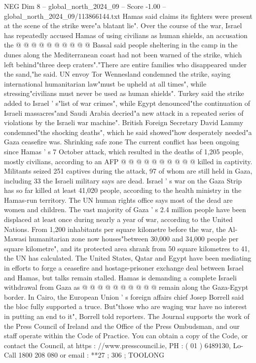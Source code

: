 \begin{textsample}{NEG Dim 8 – global\_north\_2024\_09 – Score -1.00 – global\_north\_2024\_09/113866144.txt}
Hamas said claims its fighters were present at the scene of the strike were"a blatant lie".
Over the course of the war, Israel has repeatedly accused Hamas of using civilians as human shields, an accusation the @ @ @ @ @ @ @ @ @ @ Bassal said people sheltering in the camp in the dunes along the Mediterranean coast had not been warned of the strike, which left behind"three deep craters"."There are entire families who disappeared under the sand,"he said.
UN envoy Tor Wennesland condemned the strike, saying international humanitarian law"must be upheld at all times", while stressing"civilians must never be used as human shields".
Turkey said the strike added to Israel ' s"list of war crimes", while Egypt denounced"the continuation of Israeli massacres"and Saudi Arabia decried"a new attack in a repeated series of violations by the Israeli war machine".
British Foreign Secretary David Lammy condemned"the shocking deaths", which he said showed"how desperately needed"a Gaza ceasefire was.
Shrinking safe zone The current conflict has been ongoing since Hamas ' s 7 October attack, which resulted in the deaths of 1,205 people, mostly civilians, according to an AFP @ @ @ @ @ @ @ @ @ @ killed in captivity.
Militants seized 251 captives during the attack, 97 of whom are still held in Gaza, including 33 the Israeli military says are dead.
Israel ' s war on the Gaza Strip has so far killed at least 41,020 people, according to the health ministry in the Hamas-run territory.
The UN human rights office says most of the dead are women and children.
The vast majority of Gaza ' s 2.4 million people have been displaced at least once during nearly a year of war, according to the United Nations.
From 1,200 inhabitants per square kilometre before the war, the Al-Mawasi humanitarian zone now houses"between 30,000 and 34,000 people per square kilometre", and its protected area shrank from 50 square kilometres to 41, the UN has calculated.
The United States, Qatar and Egypt have been mediating in efforts to forge a ceasefire and hostage-prisoner exchange deal between Israel and Hamas, but talks remain stalled.
Hamas is demanding a complete Israeli withdrawal from Gaza as @ @ @ @ @ @ @ @ @ @ remain along the Gaza-Egypt border.
In Cairo, the European Union ' s foreign affairs chief Josep Borrell said the bloc fully supported a truce.
But"those who are waging war have no interest in putting an end to it", Borrell told reporters.
The Journal supports the work of the Press Council of Ireland and the Office of the Press Ombudsman, and our staff operate within the Code of Practice.
You can obtain a copy of the Code, or contact the Council, at https : //www.presscouncil.ie, PH : ( 01 ) 6489130, Lo-Call 1800 208 080 or email : **27 ; 306 ; TOOLONG

\end{textsample}
